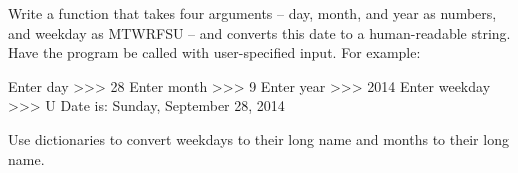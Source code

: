 \documentclass[11pt]{cselabheader}
\begin{document}
\begin{ex}[days.py] Write a function that takes four arguments -- day, month, and
    year as numbers, and weekday as MTWRFSU -- and converts this date to a
    human-readable string. Have the program be called with user-specified
    input. For example:

    \begin{verbatimcode}
Enter day >>> 28
Enter month >>> 9
Enter year >>> 2014
Enter weekday >>> U
Date is: Sunday, September 28, 2014
    \end{verbatimcode}

    Use dictionaries to convert weekdays to their long name and months to their
    long name.
\end{ex}



%
\end{document}
